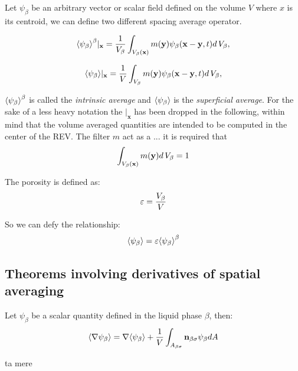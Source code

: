 Let $\psi_{\beta}$ be an arbitrary vector or scalar field defined on the volume $V$ where $x$ is its centroid, we can define two different spacing average operator.

\begin{equation}
{\left< \psi_{\beta} \right>}^{\beta}|_{\mathbf{x}} = \dfrac{1}{V_\beta} \int_{V_\beta(\mathbf{x})}  m(\mathbf{y}) \psi_{\beta}(\mathbf{x}-\mathbf{y}, t) d \, V_\beta,
\label{eq:avg_intrinsic}
\end{equation}

\begin{equation}
{\left< \psi_{\beta} \right>}|_{\mathbf{x}} = \dfrac{1}{V} \int_{V_\beta} m(\mathbf{y}) \psi_{\beta}(\mathbf{x}-\mathbf{y}, t) d \, V_\beta,
\label{eq:avg_superficial}
\end{equation}

${\left< \psi_{\beta} \right>}^{\beta}$ is called the \textit{intrinsic average} and ${\left< \psi_{\beta} \right>}$ is the \textit{superficial average}.
For the sake of a less heavy notation the $|_{\mathbf{x}}$ has been dropped in the following, within mind that the volume averaged quantities are intended to be computed in the center of the REV.
The filter $m$ act as a ... it is required that
$$
\int_{V_\beta(\mathbf{x})}  m(\mathbf{y}) d \, V_\beta = 1
$$

The porosity is defined as:
\begin{equation}
	\varepsilon = \dfrac{V_\beta}{V}
	\label{eq:porosity}
\end{equation}

So we can defy the relationship:
\begin{equation}
	{\left< \psi_{\beta} \right>} =  \varepsilon {\left< \psi_{\beta} \right>}^{\beta}
\end{equation}

\subsection{Theorems involving derivatives of spatial averaging}

\begin{theorem}
Let $\psi_{\beta}$ be a scalar quantity defined in the liquid phase $\beta$, then:
\[	{\left< \nabla \psi_{\beta} \right>} = \nabla {\left< \psi_{\beta} \right>} + \dfrac{1}{V}\int_{A_{\beta \sigma}} \mathbf{n}_{\beta \sigma} \psi_{\beta} dA \]
\end{theorem}

\begin{corollary}
	ta mere
\end{corollary}



